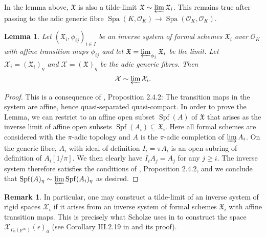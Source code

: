 \documentclass[10pt,oneside]{amsart}
\newtheorem{lemma}[theorem]{Lemma}
\theoremstyle{definition}
\newtheorem{remark}[theorem]{Remark}
\begin{document}
	In the lemma above, $\mathfrak X$ is also a tilde-limit  $\mathfrak X\sim \varprojlim \mathfrak X_i$. This remains true after passing to the adic generic fibre $\operatorname{Spa}(K,\mathcal O_K)\rightarrow \operatorname{Spa}(\mathcal O_K,\mathcal O_K)$.
	
	\begin{lemma}\label{tilde-limit from adic generic fibre of formal schemes}
		Let $(\mathfrak X_i,\phi_{ij})_{i\in I}$ be an inverse system of formal schemes $\mathfrak X_i$ over $\mathcal O_K$ with affine transition maps $\phi_{ij}$ and let $\mathfrak X=\varprojlim_{\phi_j} \mathfrak X_i$ be the limit. Let $\mathcal X_i =(\mathfrak X_i)_\eta$ and  $\mathcal X = (\mathfrak X)_\eta$ be the adic generic fibres. Then
		\[\mathcal X \sim \varprojlim \mathcal X_i.\]
	\end{lemma}
	\begin{proof}
		This is a consequence of \cite{SW}, Proposition 2.4.2: The transition maps in the system are affine, hence quasi-separated quasi-compact. In order to prove the Lemma, we can restrict to an affine open subset $\operatorname{Spf}(A)$ of $\mathfrak X$ that arises as the inverse limit of affine open subsets $\operatorname{Spf}(A_i)\subseteq \mathfrak X_i$. Here all formal schemes are considered with the $\pi$-adic topology and $A$ is the $\pi$-adic completion of $\varinjlim A_i$. 
		On the generic fibre, $A_i$ with ideal of definition $I_i=\pi A_i$ is an open subring of definition of $A_i[1/\pi]$. We then clearly have $I_iA_j = A_j$ for any $j\geq i$. The inverse system therefore satisfies the conditions of \cite{SW}, Proposition 2.4.2, and we conclude that $\operatorname{Spf}(A)_\eta \sim \varprojlim \operatorname{Spf}(A_i)_\eta$ as desired.
	\end{proof}
	
	\begin{remark}
	In particular, one may construct a tilde-limit of an inverse system of rigid spaces $\mathcal X_i$ if it arises from an inverse system of formal schemes $\mathfrak X_i$ with affine transition maps. This is precisely what Scholze uses in \cite{torsion} to construct the space $\mathcal X_{\Gamma_0(p^\infty)}(\epsilon)_a$ (see Corollary III.2.19 in \cite{torsion} and its proof).
	\end{remark}
	
	
\end{document}

